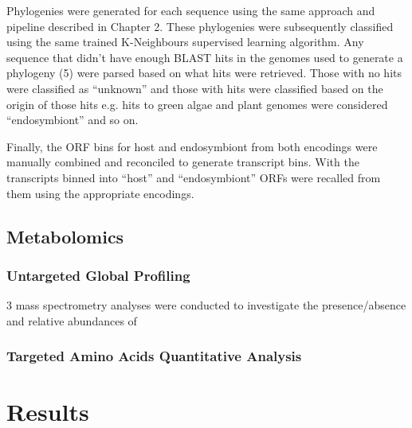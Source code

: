 {{Phylogenies were generated for each sequence using the same approach and pipeline
described in Chapter 2. These phylogenies were subsequently classified using the 
same trained K-Neighbours supervised learning algorithm.
Any sequence that didn't have enough BLAST hits in the genomes used to generate
a phylogeny (5) were parsed based on what hits were retrieved.
Those with no hits were classified as ``unknown'' and those with
hits were classified based on the origin of those hits e.g. hits
to green algae and plant genomes were considered ``endosymbiont'' and so on.

Finally, the ORF bins for host and endosymbiont 
from both encodings were manually combined and reconciled
to generate transcript bins.  With the transcripts binned into
``host'' and ``endosymbiont'' ORFs were recalled from them using the appropriate
encodings. 


\subsection{Metabolomics}

\subsubsection{Untargeted Global Profiling}

3 mass spectrometry analyses were conducted to investigate the presence/absence
and relative abundances of 


\subsubsection{Targeted Amino Acids Quantitative Analysis}



\section{Results}
}}
